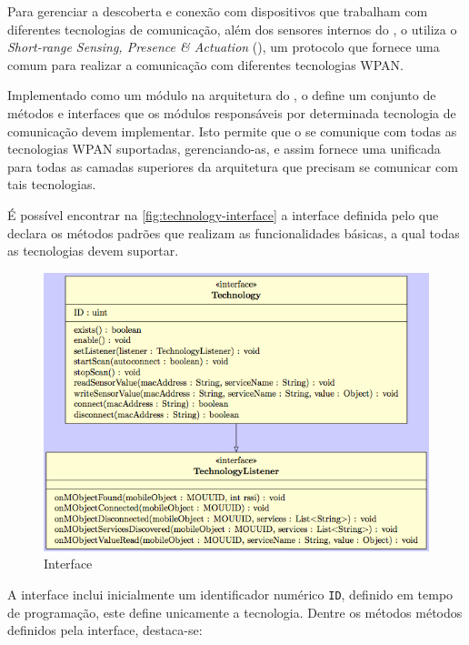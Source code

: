 Para gerenciar a descoberta e conexão com dispositivos que trabalham com diferentes tecnologias de comunicação, além dos sensores internos do \smartphone, o \mhub utiliza o \textit{Short-range Sensing, Presence \& Actuation} (\stwopa), um protocolo que fornece uma \api comum para realizar a comunicação com diferentes tecnologias WPAN.

Implementado como um módulo na arquitetura do \middleware, o \stwopa define um conjunto de métodos e interfaces que os módulos responsáveis por determinada tecnologia de comunicação devem implementar. Isto permite que o \stwopa se comunique com todas as tecnologias WPAN suportadas, gerenciando-as, e assim fornece uma \api unificada para todas as camadas superiores da arquitetura que precisam se comunicar com tais tecnologias.

É possível encontrar na \autoref{fig:technology-interface} a interface \techinterface definida pelo \stwopa que declara os métodos padrões que realizam as funcionalidades básicas, a qual todas as tecnologias devem suportar.


\begin{figure}[htb]
	\centering
	\caption{\label{fig:technology-interface}Interface \techinterface}
	\includegraphics[width=0.85\linewidth]{img/technology-interface.png}
\end{figure}

A interface \techinterface inclui inicialmente um identificador numérico \texttt{ID}, definido em tempo de programação, este define unicamente a tecnologia. Dentre os métodos métodos definidos pela interface, destaca-se:

